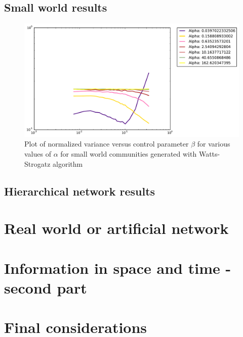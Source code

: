 \subsection{Small world results}

\begin{figure}[h]
\begin{center}
\includegraphics[scale=0.4]{images/results/vicinity_WattsStrogatz_n403_rounds10000_partial.pdf}
\caption{Plot of normalized variance versus control parameter $\beta$ for various values of $\alpha$  for small world communities generated with Watts-Strogatz algorithm}
\label{fig:scale free vicinity partial}
\end{center}
\end{figure}

\subsection{Hierarchical network results}

\section{Real world or artificial network}
\label{sec:confrontation}

\section{Information in space and time - second part}
\label{sec:spacetime2}

\section{Final considerations}
\label{sec:final}